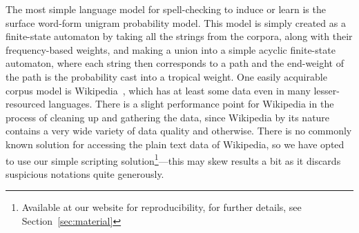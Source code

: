 \documentclass[a4paper,12pt]{article}
\begin{document}
The most simple language model for spell-checking to induce or learn is the
surface word-form unigram probability model. This model is simply created as a
finite-state automaton by taking all the strings from the corpora, along with
their frequency-based weights, and making a union into a simple acyclic
finite-state automaton, where each string then corresponds to a path and the
end-weight of the path is the probability cast into a tropical weight. One
easily acquirable corpus model is Wikipedia~\cite[]{pirinen/2010/lrec}, which
has at least some data even in many lesser-resourced languages. There is a
slight performance point for Wikipedia in the process of cleaning up and
gathering the data, since Wikipedia by its nature contains a very wide variety
of data quality and otherwise. There is no commonly known solution for
accessing the plain text data of Wikipedia, so we have opted to use our simple
scripting solution\footnote{Available at our website for reproducibility, for
further details, see Section~\ref{sec:material}}---this may skew results a bit
as it discards suspicious notations quite generously.
\end{document}
